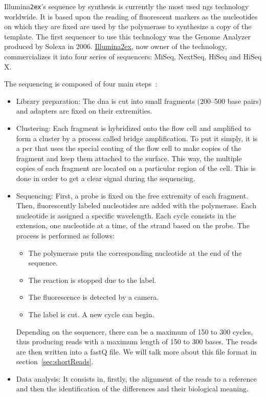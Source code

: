 Illumina\texttt{\tiny\raise 2ex\hbox{\textregistered}}'s sequence by synthesis is currently the most used \gls{ngs} technology worldwide. It is based upon the reading of fluorescent markers as the nucleotides on which they are fixed are used by the polymerase to synthesize a copy of the template. The first sequencer to use this technology was the Genome Analyzer produced by Solexa in 2006. \href{http://www.illumina.com/}{Illumina\ttfamily\tiny\raise 2ex\hbox{\textregistered}}, now owner of the technology, commercializes it into four series of sequencers: MiSeq, NextSeq, HiSeq and HiSeq X.

The sequencing is composed of four main steps~\cite{Illumina2008}:
\begin{itemize}
    \item Library preparation:
    The \gls{dna} is cut into small fragments (200--500 base pairs) and adapters are fixed on their extremities.
    \item Clustering:
    Each fragment is hybridized onto the flow cell and amplified to form a cluster by a process called bridge amplification.
    To put it simply, it is a \gls{pcr} that uses the special coating of the flow cell to make copies of the fragment and keep them attached to the surface. This way, the multiple copies of each fragment are located on a particular region of the cell. This is done in order to get a clear signal during the sequencing.
    \item Sequencing:
    First, a probe is fixed on the free extremity of each fragment. Then, fluorescently labeled nucleotides are added with the polymerase.
    Each nucleotide is assigned a specific wavelength.
    Each cycle consists in the extension, one nucleotide at a time, of the strand based on the probe. The process is performed as follows:
    \begin{itemize}
        \item The polymerase puts the corresponding nucleotide at the end of the sequence.
        \item The reaction is stopped due to the label.
        \item The fluorescence is detected by a camera.
        \item The label is cut. A new cycle can begin.
    \end{itemize}
    Depending on the sequencer, there can be a maximum of 150 to 300 cycles, thus producing reads with a maximum length of 150 to 300 bases.
    The reads are then written into a fastQ file. We will talk more about this file format in section~\ref{sec:shortReads}.

    \item Data analysis:
    It consists in, firstly, the alignment of the reads to a reference and then the identification of the differences and their biological meaning.
\end{itemize}

